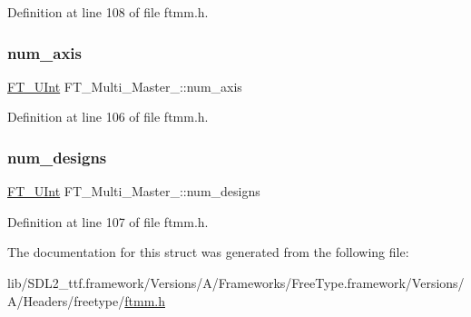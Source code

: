 Definition at line 108 of file ftmm.\+h.

\mbox{\label{struct_f_t___multi___master___a90a0ace4e40b91912259ad52fc86fb6f}} 
\subsubsection{\texorpdfstring{num\_axis}{num\_axis}}
{\footnotesize\ttfamily \mbox{\hyperlink{fttypes_8h_abcb8db4dbf35d2b55a9e8c7b0926dc52}{F\+T\+\_\+\+U\+Int}} F\+T\+\_\+\+Multi\+\_\+\+Master\+\_\+\+::num\+\_\+axis}



Definition at line 106 of file ftmm.\+h.

\mbox{\label{struct_f_t___multi___master___a78b797ee560f4b00795a7dce9656178d}} 
\subsubsection{\texorpdfstring{num\_designs}{num\_designs}}
{\footnotesize\ttfamily \mbox{\hyperlink{fttypes_8h_abcb8db4dbf35d2b55a9e8c7b0926dc52}{F\+T\+\_\+\+U\+Int}} F\+T\+\_\+\+Multi\+\_\+\+Master\+\_\+\+::num\+\_\+designs}



Definition at line 107 of file ftmm.\+h.



The documentation for this struct was generated from the following file\+:\begin{DoxyCompactItemize}
\item 
lib/\+S\+D\+L2\+\_\+ttf.\+framework/\+Versions/\+A/\+Frameworks/\+Free\+Type.\+framework/\+Versions/\+A/\+Headers/freetype/\mbox{\hyperlink{ftmm_8h}{ftmm.\+h}}\end{DoxyCompactItemize}
